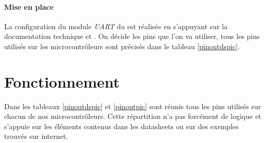 			\paragraph{Mise en place}La configuration du module \textit{UART} du \dspic est réalisée en s'appuyant sur la documentation technique \cite{DatasheetDSPIC} et \cite{DatasheetDSPIC30} . On décide les pins que l'on va utiliser, tous les pins utilisés sur les microcontrôleurs sont précisés dans le tableau \ref{pinoutdspic}.
			
			
		\section{Fonctionnement}
		Dans les tableaux \ref{pinoutdspic} et \ref{pinoutpic} sont réunis tous les pins utilisés sur chacun de nos microcontrôleurs. Cette répartition n'a pas forcément de logique et s'appuie sur les éléments contenus dans les datasheets ou sur des exemples trouvés sur internet.\\
